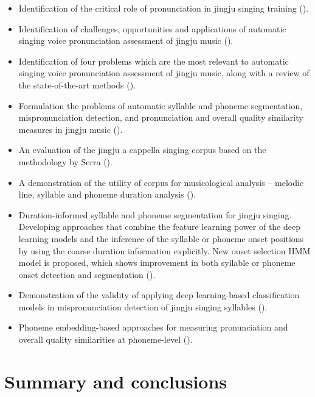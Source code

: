 \begin{itemize}[leftmargin=*]
\item Identification of the critical role of pronunciation in jingju singing training ().
\item Identification of challenges, opportunities and applications of automatic singing voice pronunciation assessment of jingju music ().
\item Identification of four problems which are the most relevant to automatic singing voice pronunciation assessment of jingju music, along with a review of the state-of-the-art methods (). 
\item Formulation the problems of automatic syllable and phoneme segmentation, mispronunciation detection, and pronunciation and overall quality similarity measures in jingju music ().
\item An evaluation of the jingju a cappella singing corpus based on the methodology by Serra \cite{Serra2014} ().
\item A demonstration of the utility of corpus for musicological analysis -- melodic line, syllable and phoneme duration analysis ().
\item Duration-informed syllable and phoneme segmentation for jingju singing. Developing approaches that combine the feature learning power of the deep learning models and the inference of the syllable or phoneme onset positions by using the coarse duration information explicitly. New onset selection \gls{HMM} model is proposed, which shows improvement in both syllable or phoneme onset detection and segmentation ().
\item Demonstration of the validity of applying deep learning-based classification models in mispronunciation detection of jingju singing syllables (). 
\item Phoneme embedding-based approaches for measuring pronunciation and overall quality similarities at phoneme-level ().
\end{itemize}

\section{Summary and conclusions}

